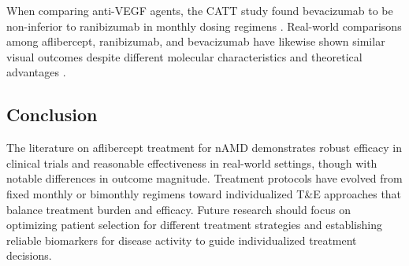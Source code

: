 When comparing anti-VEGF agents, the CATT study found bevacizumab to be non-inferior to ranibizumab in monthly dosing regimens \citep{RanibizumabBevacizumabNeovascular, martinRanibizumabBevacizumabTreatment2012}. Real-world comparisons among aflibercept, ranibizumab, and bevacizumab have likewise shown similar visual outcomes despite different molecular characteristics and theoretical advantages \citep{ciullaVisualAcuityOutcomes2020}.

\subsection{Conclusion}

The literature on aflibercept treatment for nAMD demonstrates robust efficacy in clinical trials and reasonable effectiveness in real-world settings, though with notable differences in outcome magnitude. Treatment protocols have evolved from fixed monthly or bimonthly regimens toward individualized T\&E approaches that balance treatment burden and efficacy. Future research should focus on optimizing patient selection for different treatment strategies and establishing reliable biomarkers for disease activity to guide individualized treatment decisions.

